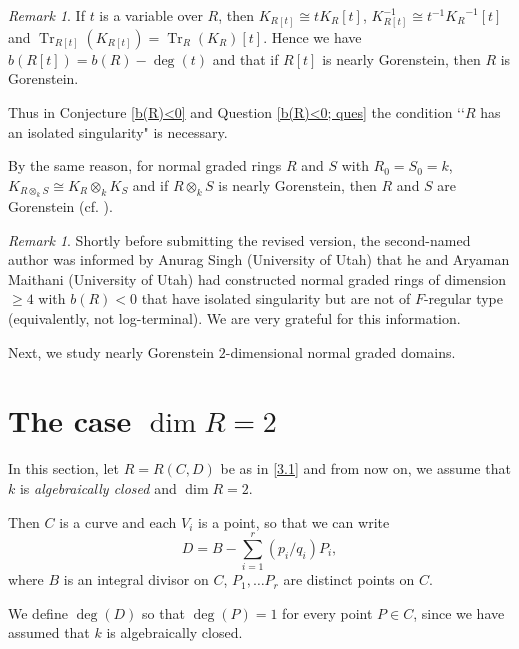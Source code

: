 \documentclass[12pt]{amsart}
\theoremstyle{definition}
\theoremstyle{remark}
\newtheorem{rem}[thm]{Remark}
\numberwithin{equation}{section}
\DeclareMathOperator{\Tr}{Tr}
\newcommand{\KiR}{{K_R}^{-1}}
\renewcommand{\:}{\colon}
\begin{document}
\begin{rem}\label{R[t]&Segre} If $t$ is a variable over $R$, then $K_{R[t]}\cong t K_R[t]$,  
$K_{R[t]}^{-1}\cong t^{-1}\KiR[t]$ and $\Tr_{R[t]}(K_{R[t]})= \Tr_R(K_R)[t]$.  
Hence we have $b(R[t]) = b(R)- \deg(t)$   
and that if $R[t]$ is nearly Gorenstein, then $R$ is Gorenstein.
\par
Thus in Conjecture \ref{b(R)<0} and Question \ref{b(R)<0; ques} the condition \lq\lq $R$ has an 
isolated singularity" is necessary.
\par  
By the same reason, for normal graded rings $R$ and $S$ with $R_0=S_0=k$, 
$K_{R\otimes_k S}\cong K_R\otimes_k K_S$ and if $R\otimes_k S$ is nearly Gorenstein, 
then $R$ and $S$ are Gorenstein (cf. \cite{HHS}).
\end{rem}

\begin{rem} \label{Singh}
Shortly before submitting the revised version, the second-named author was informed by Anurag Singh (University of Utah) that he and Aryaman Maithani (University of Utah) had constructed normal graded rings of dimension $\ge 4$ with $b(R) < 0$ that have  isolated singularity but are not of $F$-regular type (equivalently, not log-terminal). 
We are very grateful for this information.
\end{rem}


\par
Next, we study nearly Gorenstein $2$-dimensional normal graded 
domains. 

\section{The case $\dim R =2$}
\label{dim2}

In this section, let $R=R(C,D)$ be as in \ref{3.1} and from now on, we assume 
that $k$ is {\em algebraically closed} and $\dim R=2$. \par
Then $C$ is a curve and each $V_i$ is a point, so that we can write 
\begin{equation} 
D = B - \sum_{i=1}^r (p_i/q_i) P_i,
\end{equation}
where $B$ is an integral divisor on $C$, $P_1, \ldots P_r$ are distinct points on $C$. 


\par 
We define $\deg (D)$ so that $\deg(P)=1$ for every point $P\in C$, 
 since we have assumed that $k$ is algebraically closed.
\end{document}
